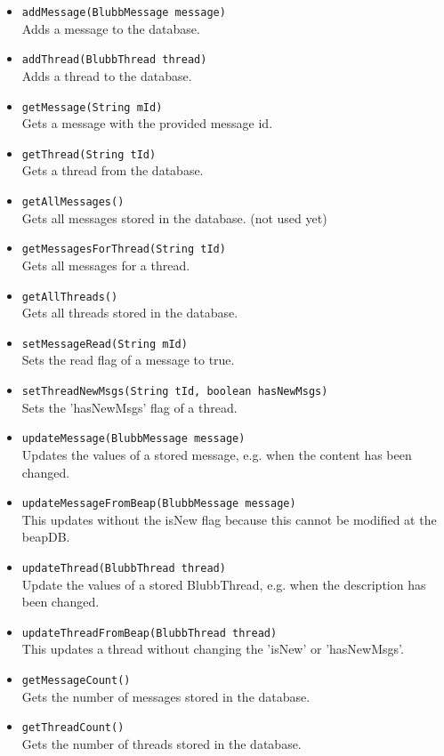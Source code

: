 \documentclass[12pt,a4paper,oneside]{report}
\newcommand{\code}[1]{\lstinline{#1}}
\begin{document}
\begin{itemize}
\item{\code{addMessage(BlubbMessage message)} 
\\Adds a message to the database.}
\item{\code{addThread(BlubbThread thread)}
\\Adds a thread to the database.}
\item{\code{getMessage(String mId)}
\\Gets a message with the provided message id.}
\item{\code{getThread(String tId)}
\\Gets a thread from the database.}
\item{\code{getAllMessages()}
\\Gets all messages stored in the database. (not used yet)}
\item{\code{getMessagesForThread(String tId)}
\\Gets all messages for a thread.}
\item{\code{getAllThreads()}
\\Gets all threads stored in the database.}
\item{\code{setMessageRead(String mId)}
\\Sets the read flag of a message to true.}
\item{\code{setThreadNewMsgs(String tId, boolean hasNewMsgs)}
\\Sets the 'hasNewMsgs' flag of a thread.}
\item{\code{updateMessage(BlubbMessage message)}
\\Updates the values of a stored message, e.g. when the content has been changed.}
\item{\code{updateMessageFromBeap(BlubbMessage message)}
\\This updates without the isNew flag because this cannot be modified at the beapDB.}
\item{\code{updateThread(BlubbThread thread)}
\\Update the values of a stored BlubbThread, e.g. when the description has been changed.}
\item{\code{updateThreadFromBeap(BlubbThread thread)}
\\This updates a thread without changing the 'isNew' or 'hasNewMsgs'.}
\item{\code{getMessageCount()}
\\Gets the number of messages stored in the database.}
\item{\code{getThreadCount()}
\\Gets the number of threads stored in the database.}
\end{itemize}
\end{document}
